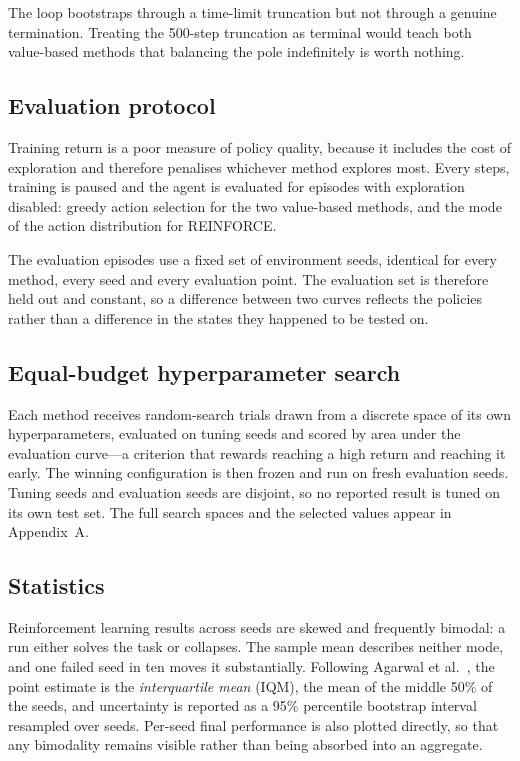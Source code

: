 \documentclass[conference]{IEEEtran}
\begin{document}
The loop bootstraps through a time-limit truncation but not through a genuine
termination. Treating the 500-step truncation as terminal would teach both
value-based methods that balancing the pole indefinitely is worth nothing.

\subsection{Evaluation protocol}

Training return is a poor measure of policy quality, because it includes the
cost of exploration and therefore penalises whichever method explores most. Every
\EvalEvery{} steps, training is paused and the agent is evaluated for
\EvalEpisodes{} episodes with exploration disabled: greedy action selection for
the two value-based methods, and the mode of the action distribution for
REINFORCE.

The evaluation episodes use a fixed set of environment seeds, identical for every
method, every seed and every evaluation point. The evaluation set is therefore
held out and constant, so a difference between two curves reflects the policies
rather than a difference in the states they happened to be tested on.

\subsection{Equal-budget hyperparameter search}

Each method receives \NumTrials{} random-search trials drawn from a discrete
space of its own hyperparameters, evaluated on \NumTuningSeeds{} tuning seeds and
scored by area under the evaluation curve---a criterion that rewards reaching a
high return and reaching it early. The winning configuration is then frozen and
run on \NumSeeds{} fresh evaluation seeds. Tuning seeds and evaluation seeds are
disjoint, so no reported result is tuned on its own test set. The full search
spaces and the selected values appear in Appendix~A.

\subsection{Statistics}

Reinforcement learning results across seeds are skewed and frequently bimodal: a
run either solves the task or collapses. The sample mean describes neither mode,
and one failed seed in ten moves it substantially. Following Agarwal et al.\
\cite{agarwal2021}, the point estimate is the \emph{interquartile mean} (IQM),
the mean of the middle 50\% of the seeds, and uncertainty is reported as a 95\%
percentile bootstrap interval resampled over seeds. Per-seed final performance is
also plotted directly, so that any bimodality remains visible rather than being
absorbed into an aggregate.
\end{document}
